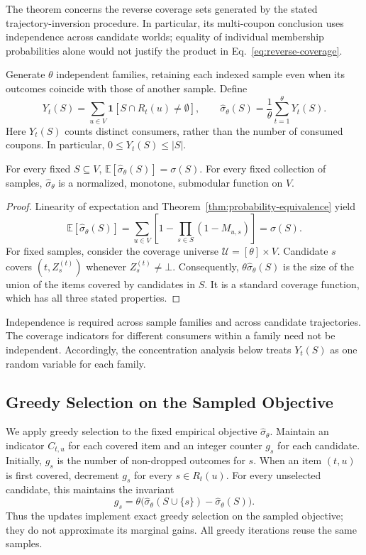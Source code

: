 \documentclass[sigconf]{acmart}
\begin{document}
The theorem concerns the reverse coverage sets generated by the
stated trajectory-inversion procedure. In particular, its
multi-coupon conclusion uses independence across candidate worlds;
equality of individual membership probabilities alone would not
justify the product in Eq.~\eqref{eq:reverse-coverage}.

Generate $\theta$ independent families, retaining each indexed
sample even when its outcomes coincide with those of another sample.
Define
\begin{equation}
\label{eq:empirical-spread}
 Y_t(S)=\sum_{u\in V}\mathbf1[S\cap R_t(u)\ne\emptyset],
 \qquad
 \hat\sigma_\theta(S)=\frac1\theta\sum_{t=1}^\theta Y_t(S).
\end{equation}
Here $Y_t(S)$ counts distinct consumers, rather than the number
of consumed coupons. In particular, $0\le Y_t(S)\le |S|$.

\begin{lemma}
\label{lem:unbiased}
For every fixed $S\subseteq V$,
$\mathbb E[\hat\sigma_\theta(S)]=\sigma(S)$.
For every fixed collection of samples, $\hat\sigma_\theta$ is a
normalized, monotone, submodular function on $V$.
\end{lemma}
\begin{proof}\renewcommand{\qedsymbol}{}
Linearity of expectation and Theorem~\ref{thm:probability-equivalence} yield
\[
 \mathbb E[\hat\sigma_\theta(S)]
 =\sum_{u\in V}\left[1-\prod_{s\in S}(1-M_{u,s})\right]
 =\sigma(S).
\]
For fixed samples, consider the coverage universe
$\mathcal U=[\theta]\times V$. Candidate $s$ covers
$(t,Z_s^{(t)})$ whenever $Z_s^{(t)}\ne\bot$.
Consequently, $\theta\hat\sigma_\theta(S)$ is the size of the
union of the items covered by candidates in $S$.
It is a standard coverage function, which has all three stated
properties.
\end{proof}

Independence is required across sample families and across
candidate trajectories. The coverage indicators for different
consumers within a family need not be independent. Accordingly,
the concentration analysis below treats $Y_t(S)$ as one random
variable for each family.

\subsection{Greedy Selection on the Sampled Objective}
\label{sec:greedy-selection}

We apply greedy selection to the fixed empirical objective
$\hat\sigma_\theta$. Maintain an indicator $C_{t,u}$ for each
covered item and an integer counter $g_s$ for each candidate.
Initially, $g_s$ is the number of non-dropped outcomes for $s$.
When an item $(t,u)$ is first covered, decrement $g_s$ for every
$s\in R_t(u)$. For every unselected candidate, this maintains
the invariant
\[
 g_s=\theta\bigl(\hat\sigma_\theta(S\cup\{s\})
                       -\hat\sigma_\theta(S)\bigr).
\]
Thus the updates implement exact greedy selection on the sampled
objective; they do not approximate its marginal gains.
All greedy iterations reuse the same samples.
\end{document}
